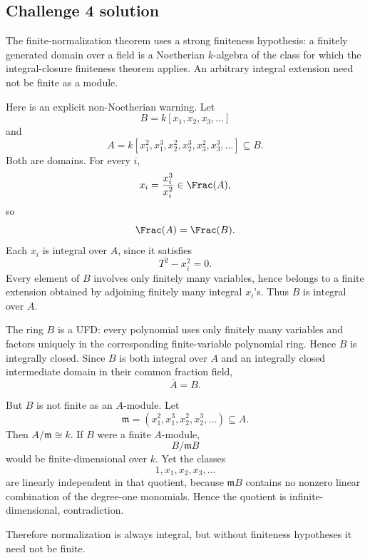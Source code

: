 \subsection*{Challenge 4 solution}
\begin{solution}
The finite-normalization theorem uses a strong finiteness hypothesis: a finitely generated domain over a field is
a Noetherian \(k\)-algebra of the class for which the integral-closure finiteness theorem applies. An arbitrary
integral extension need not be finite as a module.

Here is an explicit non-Noetherian warning. Let
\[
B=k[x_1,x_2,x_3,\ldots]
\]
and
\[
A=k[x_1^2,x_1^3,x_2^2,x_2^3,x_3^2,x_3^3,\ldots]\subseteq B.
\]
Both are domains. For every \(i\),
\[
x_i=\frac{x_i^3}{x_i^2}\in\Frac(A),
\]
so
\[
\Frac(A)=\Frac(B).
\]
Each \(x_i\) is integral over \(A\), since it satisfies
\[
T^2-x_i^2=0.
\]
Every element of \(B\) involves only finitely many variables, hence belongs to a finite extension obtained by
adjoining finitely many integral \(x_i\)'s. Thus \(B\) is integral over \(A\).

The ring \(B\) is a UFD: every polynomial uses only finitely many variables and factors uniquely in the
corresponding finite-variable polynomial ring. Hence \(B\) is integrally closed. Since \(B\) is both integral over
\(A\) and an integrally closed intermediate domain in their common fraction field,
\[
\boxed{\overline A=B.}
\]

But \(B\) is not finite as an \(A\)-module. Let
\[
\mathfrak m=(x_1^2,x_1^3,x_2^2,x_2^3,\ldots)\subseteq A.
\]
Then \(A/\mathfrak m\cong k\). If \(B\) were a finite \(A\)-module,
\[
B/\mathfrak mB
\]
would be finite-dimensional over \(k\). Yet the classes
\[
1,x_1,x_2,x_3,\ldots
\]
are linearly independent in that quotient, because \(\mathfrak mB\) contains no nonzero linear combination of
the degree-one monomials. Hence the quotient is infinite-dimensional, contradiction.

Therefore normalization is always integral, but without finiteness hypotheses it need not be finite.
\end{solution}

